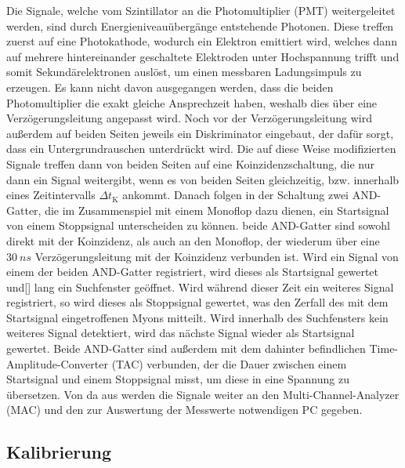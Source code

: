 Die Signale, welche vom Szintillator an die Photomultiplier (PMT) weitergeleitet werden, sind durch Energieniveauübergänge entstehende Photonen. Diese treffen zuerst auf eine Photokathode,
wodurch ein Elektron emittiert wird, welches dann auf mehrere hintereinander geschaltete Elektroden unter Hochspannung trifft und somit Sekundärelektronen auslöst, um einen messbaren
Ladungsimpuls zu erzeugen. Es kann nicht davon ausgegangen werden, dass die beiden Photomultiplier die exakt gleiche Ansprechzeit haben, weshalb dies über eine Verzögerungsleitung 
angepasst wird. Noch vor der Verzögerungsleitung wird außerdem auf beiden Seiten jeweils ein Diskriminator eingebaut, der dafür sorgt, dass ein Untergrundrauschen unterdrückt wird.
Die auf diese Weise modifizierten Signale treffen dann von beiden Seiten auf eine Koinzidenzschaltung, die nur dann ein Signal weitergibt, wenn es von beiden Seiten gleichzeitig,
bzw. innerhalb eines Zeitintervalls $\Delta t_\text{K} $ ankommt. 
Danach folgen in der Schaltung zwei AND-Gatter, die im Zusammenspiel mit einem Monoflop dazu dienen, ein Startsignal von einem Stoppsignal unterscheiden zu können. beide AND-Gatter
sind sowohl direkt mit der Koinzidenz, als auch an den Monoflop, der wiederum über eine $\SI{30}{ns}$ Verzögerungsleitung mit der Koinzidenz verbunden ist. Wird ein Signal von einem 
der beiden AND-Gatter registriert, wird dieses als Startsignal gewertet und[] lang ein Suchfenster geöffnet. Wird während dieser Zeit ein weiteres Signal registriert, so wird dieses 
als Stoppsignal gewertet, was den Zerfall des mit dem Startsignal eingetroffenen Myons mitteilt. Wird innerhalb des Suchfensters kein weiteres Signal detektiert, wird das nächste Signal 
wieder als Startsignal gewertet. Beide AND-Gatter sind außerdem mit 
dem dahinter befindlichen Time-Amplitude-Converter (TAC) verbunden, der die Dauer zwischen einem Startsignal und einem Stoppsignal misst, um diese in eine Spannung zu 
übersetzen. Von da aus werden die Signale weiter an den Multi-Channel-Analyzer (MAC) und den zur Auswertung der Messwerte notwendigen PC gegeben.

\subsection{Kalibrierung}

